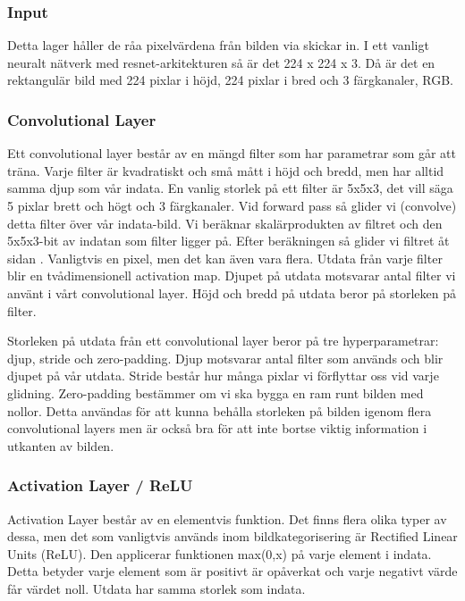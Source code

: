 \documentclass[]{kththesis}
\begin{document}
\subsubsection{Input}
Detta lager håller de råa pixelvärdena från bilden via skickar in. I ett vanligt neuralt nätverk med resnet-arkitekturen så är det 224 x 224 x 3. Då är det en rektangulär bild med 224 pixlar i höjd, 224 pixlar i bred och 3 färgkanaler, RGB.

\subsubsection{Convolutional Layer}
Ett convolutional layer består av en mängd filter som har parametrar som går att träna. Varje filter är kvadratiskt och små mått i höjd och bredd, men har alltid samma djup som vår indata. En vanlig storlek på ett filter är 5x5x3, det vill säga 5 pixlar brett och högt och 3 färgkanaler. Vid forward pass så glider vi (convolve) detta filter över vår indata-bild. Vi beräknar skalärprodukten av filtret och den 5x5x3-bit av indatan som filter ligger på. Efter beräkningen så glider vi filtret åt sidan \parencite{he2015spatial}. Vanligtvis en pixel, men det kan även vara flera. Utdata från varje filter blir en tvådimensionell activation map. Djupet på utdata motsvarar antal filter vi använt i vårt convolutional layer. Höjd och bredd på utdata beror på storleken på filter.

Storleken på utdata från ett convolutional layer beror på tre hyperparametrar: djup, stride och zero-padding. Djup motsvarar antal filter som används och blir djupet på vår utdata. Stride består hur många pixlar vi förflyttar oss vid varje glidning. Zero-padding bestämmer om vi ska bygga en ram runt bilden med nollor. Detta användas för att kunna behålla storleken på bilden igenom flera convolutional layers men är också bra för att inte bortse viktig information i utkanten av bilden.

\subsubsection{Activation Layer / ReLU}
Activation Layer består av en elementvis funktion. Det finns flera olika typer av dessa, men det som vanligtvis används inom bildkategorisering är Rectified Linear Units (ReLU). Den applicerar funktionen max(0,x) på varje element i indata. Detta betyder varje element som är positivt är opåverkat och varje negativt värde får värdet noll. Utdata har samma storlek som indata.
\end{document}
